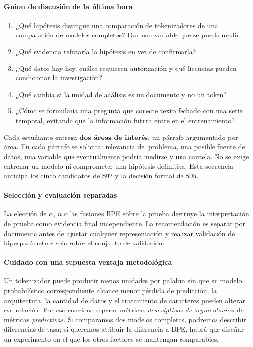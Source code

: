 \paragraph{Guion de discusión de la última hora}

\begin{enumerate}
\item ¿Qué hipótesis distingue una comparación de tokenizadores de una
 comparación de modelos completos? Dar una variable que se pueda medir.
\item ¿Qué evidencia refutaría la hipótesis en vez de confirmarla?
\item ¿Qué datos hay hoy, cuáles requieren autorización y qué licencias
 pueden condicionar la investigación?
\item ¿Qué cambia si la unidad de análisis es un documento y no un token?
\item ¿Cómo se formularía una pregunta que conecte texto fechado con una
 serie temporal, evitando que la información futura entre en el entrenamiento?
\end{enumerate}
\begin{investigacion}
Cada estudiante entrega \textbf{dos áreas de interés}, un párrafo argumentado
por área. En cada párrafo se solicita: relevancia del problema, una posible
fuente de datos, una variable que eventualmente podría medirse y una cautela.
No se exige entrenar un modelo ni comprometer una hipótesis definitiva.
Esta secuencia anticipa los cinco candidatos de S02 y la decisión formal de S05.
\end{investigacion}

\paragraph{Selección y evaluación separadas}
La elección de $\alpha$, $n$ o las fusiones BPE sobre la prueba destruye la
interpretación de prueba como evidencia final independiente. La recomendación
es separar por documento antes de ajustar cualquier representación y realizar
validación de hiperparámetros solo sobre el conjunto de validación.

\paragraph{Cuidado con una supuesta ventaja metodológica}

Un tokenizador puede producir menos unidades por palabra sin que
su modelo probabilístico correspondiente alcance menor pérdida de
predicción; la arquitectura, la cantidad de datos y el tratamiento
de caracteres pueden alterar esa relación. Por eso conviene separar
métricas \emph{descriptivas de segmentación} de métricas \emph{predictivas}.
Si comparamos dos modelos completos, podremos describir diferencias
de tasa; si queremos atribuir la diferencia a BPE, habrá que diseñar un
experimento en el que los otros factores se mantengan comparables.

